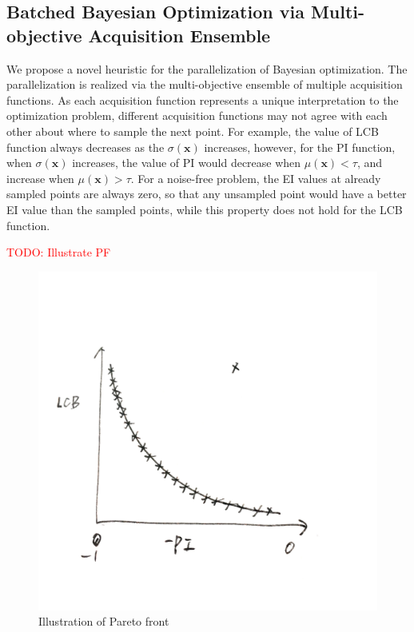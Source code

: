 
\subsection{Batched Bayesian Optimization via Multi-objective Acquisition Ensemble}

We propose a novel heuristic for the parallelization of Bayesian optimization.
The parallelization is realized via the multi-objective ensemble of multiple
acquisition functions. As each acquisition function represents a unique
interpretation to the optimization problem, different acquisition functions may
not agree with each other about where to sample the next point. For example,
the value of LCB function always decreases as the $\sigma(\bm{x})$ increases,
however, for the PI function, when $\sigma(\bm{x})$ increases, the value of PI
would decrease when $\mu(\bm{x}) < \tau$, and increase when $\mu(\bm{x}) >
\tau$. For a noise-free problem, the EI values at already sampled points are
always zero, so that any unsampled point would have a better EI value than the
sampled points, while this property does not hold for the LCB function.

\textcolor{red}{TODO: Illustrate PF}
\begin{figure}[ht]
    \vskip 0.2in
    \begin{center}
        \centerline{\includegraphics[width=\columnwidth]{./img/pf.jpg}}
        \caption{Illustration of Pareto front}
        \label{fig:PF_example}
    \end{center}
    \vskip -0.2in
\end{figure}

